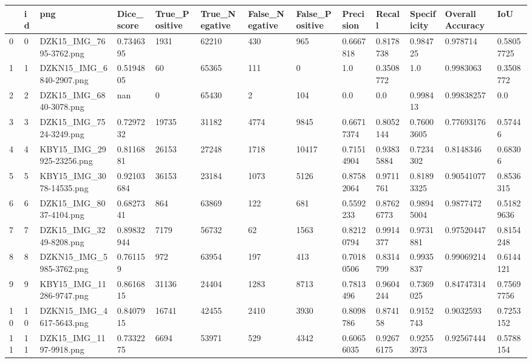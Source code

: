 \documentclass[11pt, a4paper, twoside]{report}
\begin{document}
\begin{longtable}[c]{@{}lllllllllllll@{}}
\toprule
 & id & png & Dice\_score & True\_Positive & True\_Negative & False\_Negative & False\_Positive & Precision & Recall & Specificity & Overall Accuracy & IoU \\* \midrule
\endhead
%
\bottomrule
\endfoot
%
\endlastfoot
%
0 & 0 & DZK15\_IMG\_7695-3762.png & 0.7346395 & 1931 & 62210 & 430 & 965 & 0.6667818 & 0.8178738 & 0.984725 & 0.978714 & 0.58057725 \\
1 & 1 & DZKN15\_IMG\_6840-2907.png & 0.5194805 & 60 & 65365 & 111 & 0 & 1.0 & 0.3508772 & 1.0 & 0.9983063 & 0.3508772 \\
2 & 2 & DZK15\_IMG\_6840-3078.png & nan & 0 & 65430 & 2 & 104 & 0.0 & 0.0 & 0.998413 & 0.99838257 & 0.0 \\
3 & 3 & DZK15\_IMG\_7524-3249.png & 0.7297232 & 19735 & 31182 & 4774 & 9845 & 0.66717374 & 0.8052144 & 0.76003605 & 0.77693176 & 0.57446 \\
4 & 4 & KBY15\_IMG\_29925-23256.png & 0.8116881 & 26153 & 27248 & 1718 & 10417 & 0.71514904 & 0.93835884 & 0.7234302 & 0.8148346 & 0.68306 \\
5 & 5 & KBY15\_IMG\_3078-14535.png & 0.92103684 & 36153 & 23184 & 1073 & 5126 & 0.87582064 & 0.9711761 & 0.81893325 & 0.90541077 & 0.8536315 \\
6 & 6 & DZK15\_IMG\_8037-4104.png & 0.6827341 & 864 & 63869 & 122 & 681 & 0.5592233 & 0.87626773 & 0.98945004 & 0.9877472 & 0.51829636 \\
7 & 7 & DZK15\_IMG\_3249-8208.png & 0.89832944 & 7179 & 56732 & 62 & 1563 & 0.82120794 & 0.9914377 & 0.9731881 & 0.97520447 & 0.8154248 \\
8 & 8 & DZKN15\_IMG\_5985-3762.png & 0.761159 & 972 & 63954 & 197 & 413 & 0.70180506 & 0.8314799 & 0.9935837 & 0.99069214 & 0.6144121 \\
9 & 9 & KBY15\_IMG\_11286-9747.png & 0.8616815 & 31136 & 24404 & 1283 & 8713 & 0.7813496 & 0.9604244 & 0.7369025 & 0.84747314 & 0.75697756 \\
10 & 10 & DZKN15\_IMG\_4617-5643.png & 0.8407915 & 16741 & 42455 & 2410 & 3930 & 0.8098786 & 0.874158 & 0.9152743 & 0.9032593 & 0.7253152 \\
11 & 11 & DZK15\_IMG\_1197-9918.png & 0.7332275 & 6694 & 53971 & 529 & 4342 & 0.60656035 & 0.92676175 & 0.92553973 & 0.92567444 & 0.5788154 \\

\end{longtable}
\end{document}
